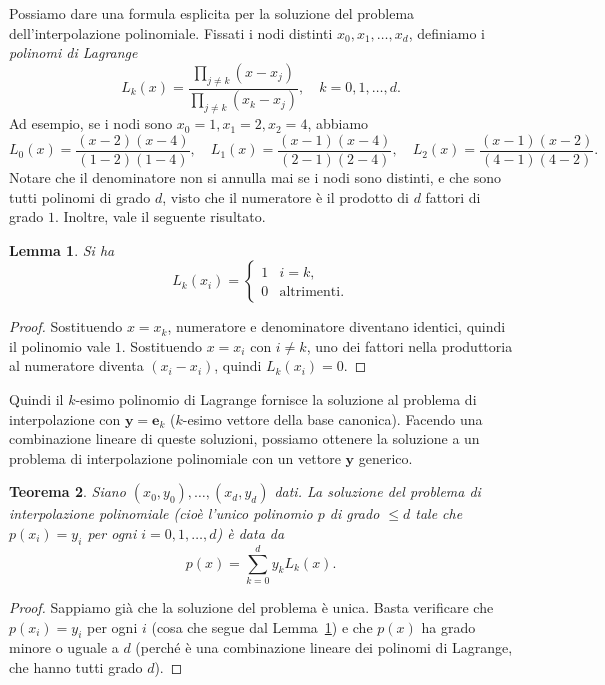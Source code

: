 \documentclass[a4paper]{report}
\newtheorem{theorem}{Teorema}[chapter]
\newtheorem{lemma}[theorem]{Lemma}
\theoremstyle{definition}
\theoremstyle{remark}
\newcommand{\e}{\mathbf{e}}
\begin{document}
Possiamo dare una formula esplicita per la soluzione del problema dell'interpolazione polinomiale. Fissati i nodi distinti $x_0,x_1,\dots,x_d$, definiamo i \emph{polinomi di Lagrange}
\[
L_k(x) = \frac{\prod_{j\neq k}(x - x_j)}{\prod_{j\neq k}(x_k - x_j)}, \quad k=0,1,\dots,d.
\]
Ad esempio, se i nodi sono $x_0 = 1, x_1 = 2, x_2 = 4$, abbiamo
\[
L_0(x) = \frac{(x-2)(x-4)}{(1-2)(1-4)}, \quad L_1(x) = \frac{(x-1)(x-4)}{(2-1)(2-4)}, \quad L_2(x) = \frac{(x-1)(x-2)}{(4-1)(4-2)}.
\]
Notare che il denominatore non si annulla mai se i nodi sono distinti, e che sono tutti polinomi di grado $d$, visto che il numeratore è il prodotto di $d$ fattori di grado $1$. Inoltre, vale il seguente risultato.
\begin{lemma} \label{lem:polylagrange}
Si ha
\[
L_k(x_i) = \begin{cases}
1 & i=k,\\
0 & \text{altrimenti}.
\end{cases}
\]
\end{lemma}
\begin{proof}
Sostituendo $x = x_k$, numeratore e denominatore diventano identici, quindi il polinomio vale $1$. Sostituendo $x = x_i$ con $i\neq k$, uno dei fattori nella produttoria al numeratore diventa $(x_i-x_i)$, quindi $L_k(x_i) = 0$.
\end{proof}
Quindi il $k$-esimo polinomio di Lagrange fornisce la soluzione al problema di interpolazione con $\mathbf{y} = \e_k$ ($k$-esimo vettore della base canonica). Facendo una combinazione lineare di queste soluzioni, possiamo ottenere la soluzione a un problema di interpolazione polinomiale con un vettore $\mathbf{y}$ generico.
\begin{theorem}
Siano $(x_0,y_0),\dots,(x_d,y_d)$ dati. La soluzione del problema di interpolazione polinomiale (cioè l'unico polinomio $p$ di grado $\leq d$ tale che $p(x_i)=y_i$ per ogni $i=0,1,\dots,d$) è data da
\[
p(x) = \sum_{k=0}^d y_k L_k(x).
\]
\end{theorem}
\begin{proof}
Sappiamo già che la soluzione del problema è unica. Basta verificare che $p(x_i) = y_i$ per ogni $i$ (cosa che segue dal Lemma~\ref{lem:polylagrange}) e che $p(x)$ ha grado minore o uguale a $d$ (perché è una combinazione lineare dei polinomi di Lagrange, che hanno tutti grado $d$). 
\end{proof}

\end{document}
